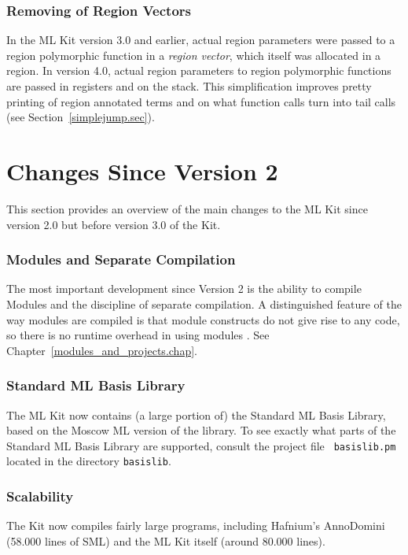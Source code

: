 \documentclass[12pt]{book}
\begin{document}
\subsubsection*{Removing of Region Vectors}
%
In the ML Kit version 3.0 and earlier, actual region parameters were
passed to a region polymorphic function in a {\em region vector},
which itself was allocated in a region. In version 4.0, actual region
parameters to
%
region polymorphic functions are passed in registers and on the stack.
This simplification improves pretty printing of region annotated terms
and on what function calls turn into tail calls (see
Section~\ref{simplejump.sec}).


\section{Changes Since Version 2}
%
This section provides an overview of the main changes to the ML Kit
since version 2.0 but before version 3.0 of the Kit.

\subsubsection*{Modules and Separate Compilation}
The most important development since Version 2 is the ability to
compile Modules and the discipline of separate compilation. A
distinguished feature of the way modules are compiled is that module
constructs do not give rise to any code, so there is no runtime
overhead in using modules \cite{ElsmanICFP99,ElsmanThesis}. See
Chapter~\ref{modules_and_projects.chap}.

\subsubsection*{Standard ML Basis Library}
The ML Kit now contains (a large portion of) the  Standard ML Basis Library, based on the Moscow ML
version of the library. To see exactly what parts of the Standard ML
Basis Library are supported, consult the project file {\tt
  basislib.pm} located in the directory {\tt basislib}.

\subsubsection*{Scalability}
The Kit now compiles fairly large programs, including Hafnium's AnnoDomini
(58.000 lines of SML) and the ML Kit itself (around 80.000 lines).
\end{document}

